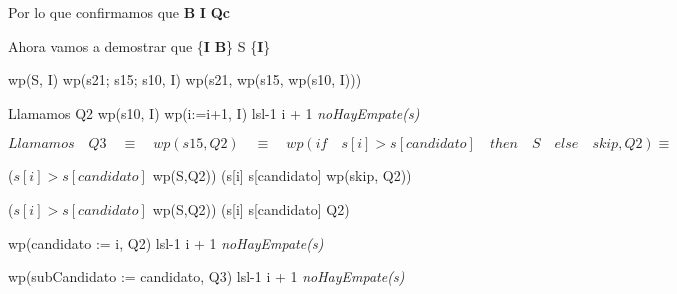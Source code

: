 \documentclass[10pt,a4paper]{article}
\begin{document}
{{{{ Por lo que confirmamos que \neg\textbf{B} \wedge \textbf{I} \implies \textbf{Qc}

 \vspace{5mm}

Ahora vamos a demostrar que \{\textbf{I} \wedge \textbf{B}\} S \{\textbf{I}\}

 \vspace{5mm}
 wp(S, I) \equiv wp(s21; s15; s10, I) \equiv wp(s21, wp(s15, wp(s10, I)))
 
 \vspace{5mm}
 Llamamos Q2 \equiv wp(s10, I) \equiv wp(i:=i+1, I) \equiv lsl-1 \geq i + 1  \wedge  \textit{noHayEmpate(s)} \wedge


 \wedge 


 \vspace{5mm}

 $Llamamos \quad Q3 \quad \equiv \quad wp(s15, Q2) \quad \equiv \quad wp(if \quad s[i] > s[candidato] \quad then \quad S \quad else \quad skip, Q2)
 \equiv$
 
 ($s[i] > s[candidato]$ \wedge wp(S,Q2)) \lor (s[i] \leq s[candidato] \wedge wp(skip, Q2)) \equiv

  ($s[i] > s[candidato]$ \wedge wp(S,Q2)) \lor (s[i] \leq s[candidato] \wedge Q2)

 \vspace{5mm}

wp(candidato := i, Q2) \equiv  lsl-1 \geq i + 1  \wedge  \textit{noHayEmpate(s)} \wedge


 \wedge 


 \vspace{5mm}

wp(subCandidato := candidato, Q3) \equiv  lsl-1 \geq i + 1  \wedge  \textit{noHayEmpate(s)} \wedge


 \wedge 


}}}}
\end{document}
